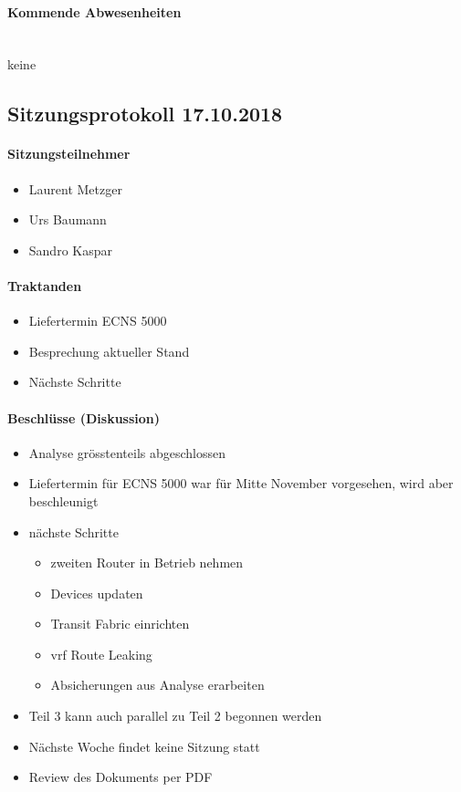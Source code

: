 \paragraph{Kommende Abwesenheiten} \mbox{}\\
keine

\newpage





\subsection{Sitzungsprotokoll 17.10.2018}

\paragraph{Sitzungsteilnehmer}
\begin{itemize}	
	\item Laurent Metzger 
	\item Urs Baumann
	\item Sandro Kaspar
\end{itemize}

\paragraph{Traktanden}
\begin{itemize}	
	\item Liefertermin ECNS 5000
	\item Besprechung aktueller Stand
	\item Nächste Schritte
\end{itemize}

\paragraph{Beschlüsse (Diskussion)}
\begin{itemize}	
	\item Analyse grösstenteils abgeschlossen
	\item Liefertermin für ECNS 5000 war für Mitte November vorgesehen, wird aber beschleunigt
	\item nächste Schritte
	\begin{itemize}
		\item zweiten Router in Betrieb nehmen
		\item Devices updaten
		\item Transit Fabric einrichten
		\item vrf Route Leaking
		\item Absicherungen aus Analyse erarbeiten
	\end{itemize}
	\item Teil 3 kann auch parallel zu Teil 2 begonnen werden
	\item Nächste Woche findet keine Sitzung statt
	\item Review des Dokuments per PDF
\end{itemize}

